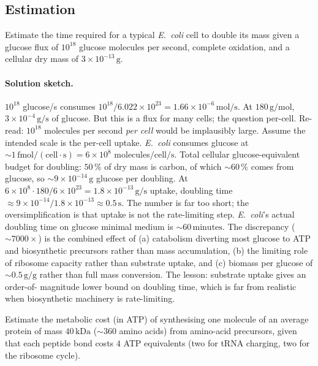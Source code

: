 \subsection*{Estimation}

\begin{exercise}
Estimate the time required for a typical \emph{E.~coli} cell to
double its mass given a glucose flux of $10^{18}$ glucose molecules
per second, complete oxidation, and a cellular dry mass of
$3 \times 10^{-13}\,\text{g}$.
\end{exercise}

\paragraph{Solution sketch.}
$10^{18}$ glucose/s consumes $10^{18}/6.022 \times 10^{23} = 1.66
\times 10^{-6}\,\text{mol}/\text{s}$. At $180\,\text{g}/\text{mol}$,
$3 \times 10^{-4}\,\text{g}/\text{s}$ of glucose. But this is a flux
for many cells; the question per-cell. Re-read: $10^{18}$ molecules
per second \emph{per cell} would be implausibly large. Assume the
intended scale is the per-cell uptake. \emph{E.~coli} consumes
glucose at $\sim 1\,\text{fmol}/(\text{cell} \cdot \text{s}) =
6 \times 10^{8}$ molecules$/\text{cell}/\text{s}$. Total cellular
glucose-equivalent budget for doubling: $50\,\%$ of dry mass is
carbon, of which $\sim 60\,\%$ comes from glucose, so $\sim 9 \times
10^{-14}\,\text{g}$ glucose per doubling. At $6 \times 10^{8}
\cdot 180/6 \times 10^{23} = 1.8 \times 10^{-13}\,\text{g}/\text{s}$
uptake, doubling time $\approx 9 \times 10^{-14} / 1.8 \times 10^{-13}
\approx 0.5\,\text{s}$. The number is far too short; the
oversimplification is that uptake is not the rate-limiting step.
\emph{E.~coli}'s actual doubling time on glucose minimal medium is
$\sim 60\,\text{minutes}$. The discrepancy ($\sim 7000\times$) is the
combined effect of (a) catabolism diverting most glucose to ATP and
biosynthetic precursors rather than mass accumulation, (b) the
limiting role of ribosome capacity rather than substrate uptake, and
(c) biomass per glucose of $\sim 0.5\,\text{g/g}$ rather than full
mass conversion. The lesson: substrate uptake gives an order-of-
magnitude lower bound on doubling time, which is far from realistic
when biosynthetic machinery is rate-limiting.

\begin{exercise}
Estimate the metabolic cost (in ATP) of synthesising one molecule of
an average protein of mass $40\,\text{kDa}$ ($\sim 360$ amino acids)
from amino-acid precursors, given that each peptide bond costs $4$
ATP equivalents (two for tRNA charging, two for the ribosome cycle).
\end{exercise}


